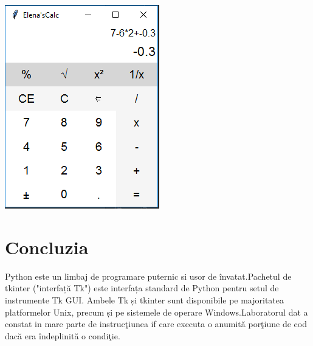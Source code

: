 \documentclass[12pt]{article}
\begin{document}
\includegraphics{example.png}\\
\section*{Concluzia}
Python este un limbaj de programare puternic si usor de învatat.Pachetul de tkinter ("interfață Tk") este interfața standard de Python pentru setul de instrumente Tk GUI. Ambele Tk și tkinter sunt disponibile pe majoritatea platformelor Unix, precum și pe sistemele de operare Windows.Laboratorul dat a constat in mare parte de instrucţiunea if care  executa o anumită porţiune de cod dacă era îndeplinită o condiţie.  
\end{document}
